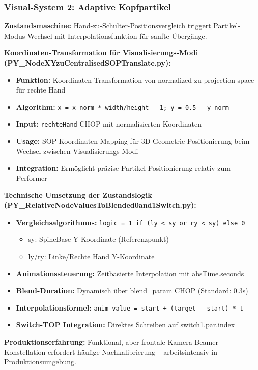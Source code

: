 \subsubsection{Visual-System 2: Adaptive Kopfpartikel}

\textbf{Zustandsmaschine:} Hand-zu-Schulter-Positionsvergleich triggert Partikel-Modus-Wechsel mit Interpolationsfunktion für sanfte Übergänge.

\textbf{Koordinaten-Transformation für Visualisierungs-Modi (PY\_NodeXYzuCentralisedSOPTranslate.py):}
\begin{itemize}
    \item \textbf{Funktion:} Koordinaten-Transformation von normalized zu projection space für rechte Hand
    \item \textbf{Algorithm:} \texttt{x = x\_norm * width/height - 1; y = 0.5 - y\_norm}
    \item \textbf{Input:} \texttt{rechteHand} CHOP mit normalisierten Koordinaten
    \item \textbf{Usage:} SOP-Koordinaten-Mapping für 3D-Geometrie-Positionierung beim Wechsel zwischen Visualisierungs-Modi
    \item \textbf{Integration:} Ermöglicht präzise Partikel-Positionierung relativ zum Performer
\end{itemize}

\textbf{Technische Umsetzung der Zustandslogik (PY\_RelativeNodeValuesToBlended0and1Switch.py):}
\begin{itemize}
    \item \textbf{Vergleichsalgorithmus:} \texttt{logic = 1 if (ly < sy or ry < sy) else 0}
    \begin{itemize}
        \item sy: SpineBase Y-Koordinate (Referenzpunkt)
        \item ly/ry: Linke/Rechte Hand Y-Koordinate
    \end{itemize}
    \item \textbf{Animationssteuerung:} Zeitbasierte Interpolation mit absTime.seconds
    \item \textbf{Blend-Duration:} Dynamisch über blend\_param CHOP (Standard: 0.3s)
    \item \textbf{Interpolationsformel:} \texttt{anim\_value = start + (target - start) * t}
    \item \textbf{Switch-TOP Integration:} Direktes Schreiben auf switch1.par.index
\end{itemize}

\textbf{Produktionserfahrung:} Funktional, aber frontale Kamera-Beamer-Konstellation erfordert häufige Nachkalibrierung – arbeitsintensiv in Produktionsumgebung.

